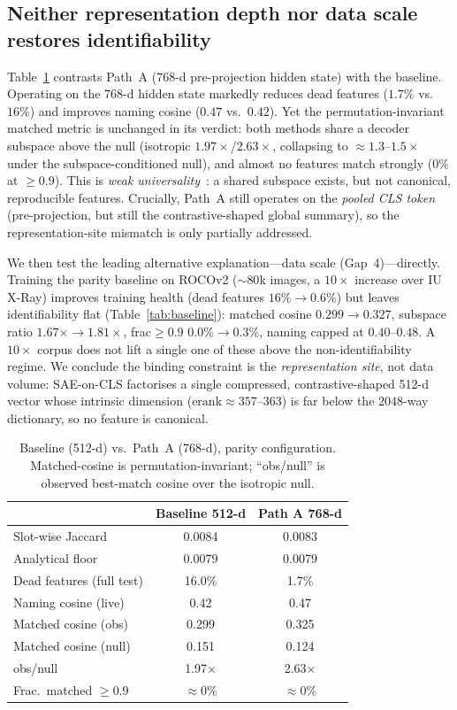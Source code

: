 \documentclass[sigconf, nonacm]{acmart}
\begin{document}
\subsection{Neither representation depth nor data scale restores identifiability}
Table~\ref{tab:patha} contrasts Path~A (768-d pre-projection hidden state) with the baseline. Operating on the 768-d hidden state markedly reduces dead features ($1.7\%$ vs.\ $16\%$) and improves naming cosine ($0.47$ vs.\ $0.42$). Yet the permutation-invariant matched metric is unchanged in its verdict: both methods share a decoder subspace above the null (isotropic $1.97{\times}$/$2.63{\times}$, collapsing to ${\approx}1.3$--$1.5{\times}$ under the subspace-conditioned null), and almost no features match strongly ($0\%$ at $\geq0.9$). This is \emph{weak universality}~\cite{lan2024universality,leask2025canonical}: a shared subspace exists, but not canonical, reproducible features. Crucially, Path~A still operates on the \emph{pooled CLS token} (pre-projection, but still the contrastive-shaped global summary), so the representation-site mismatch is only partially addressed.

We then test the leading alternative explanation---data scale (Gap~4)---directly. Training the parity baseline on ROCOv2 (${\sim}80$k images, a $10{\times}$ increase over IU X-Ray) improves training health (dead features $16\%{\to}0.6\%$) but leaves identifiability flat (Table~\ref{tab:baseline}): matched cosine $0.299{\to}0.327$, subspace ratio $1.67{\times}{\to}1.81{\times}$, frac${\geq}0.9$ $0.0\%{\to}0.3\%$, naming capped at $0.40$--$0.48$. A $10{\times}$ corpus does not lift a single one of these above the non-identifiability regime. We conclude the binding constraint is the \emph{representation site}, not data volume: SAE-on-CLS factorises a single compressed, contrastive-shaped 512-d vector whose intrinsic dimension ($\mathrm{erank}{\approx}357$--$363$) is far below the $2048$-way dictionary, so no feature is canonical.

\begin{table}[t]
\caption{Baseline (512-d) vs.\ Path~A (768-d), parity configuration. Matched-cosine is permutation-invariant; ``obs/null'' is observed best-match cosine over the isotropic null.}
\label{tab:patha}
\small
\begin{tabular}{lcc}
\toprule
 & Baseline 512-d & Path A 768-d \\
\midrule
Slot-wise Jaccard & 0.0084 & 0.0083 \\
Analytical floor & 0.0079 & 0.0079 \\
Dead features (full test) & 16.0\% & 1.7\% \\
Naming cosine (live) & 0.42 & 0.47 \\
Matched cosine (obs) & 0.299 & 0.325 \\
Matched cosine (null) & 0.151 & 0.124 \\
obs/null & 1.97$\times$ & 2.63$\times$ \\
Frac.\ matched $\geq0.9$ & $\approx$0\% & $\approx$0\% \\
\bottomrule
\end{tabular}
\end{table}
\end{document}
